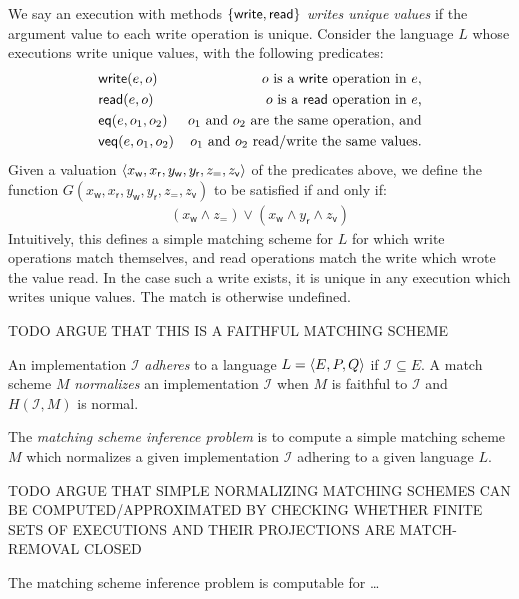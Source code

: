 \begin{example}

  We say an execution with methods ${\{{\mathsf{write}, \mathsf{read}}\}}$
  \emph{writes unique values} if the argument value to each write operation is
  unique. Consider the language $L$ whose executions write unique values, with
  the following predicates:
  \begin{align*}
    & \mathsf{write}(e,o) & \text{$o$ is a {\sf write} operation in $e$}, \\
    & \mathsf{read}(e,o) & \text{$o$ is a {\sf read} operation in $e$,} \\
    & \mathsf{eq}(e,o_1,o_2) & \text{$o_1$ and $o_2$ are the same operation, and} \\
    & \mathsf{veq}(e,o_1,o_2) & \text{$o_1$ and $o_2$ read/write the same values.}
  \end{align*}
  Given a valuation ${\left\langle{x_\mathsf{w}, x_\mathsf{r}, y_\mathsf{w},
  y_\mathsf{r}, z_\mathsf{=}, z_\mathsf{v}}\right\rangle}$ of the predicates above, we define
  the function $G(x_\mathsf{w}, x_\mathsf{r}, y_\mathsf{w}, y_\mathsf{r},
  z_\mathsf{=}, z_\mathsf{v})$ to be satisfied if and only if:
  \begin{align*}
    ( x_\mathsf{w} \land z_\mathsf{=} )
    \lor ( x_\mathsf{w} \land y_\mathsf{r} \land z_\mathsf{v} )
  \end{align*}
  Intuitively, this defines a simple matching scheme for $L$ for which write
  operations match themselves, and read operations match the write which wrote
  the value read. In the case such a write exists, it is unique in any
  execution which writes unique values. The match is otherwise undefined.

  TODO ARGUE THAT THIS IS A FAITHFUL MATCHING SCHEME 

\end{example}

An implementation $\mathcal{I}$ \emph{adheres} to a language $L = {\left\langle{E,P,Q}\right\rangle}$
if $\mathcal{I} \subseteq E$. A match scheme $M$ \emph{normalizes} an
implementation $\mathcal{I}$ when $M$ is faithful to $\mathcal{I}$ and
$H(\mathcal{I},M)$ is normal.

\begin{definition}

  The \emph{matching scheme inference problem} is to compute a simple matching
  scheme $M$ which normalizes a given implementation $\mathcal{I}$ adhering to
  a given language $L$.

\end{definition}

TODO ARGUE THAT SIMPLE NORMALIZING MATCHING SCHEMES CAN BE
COMPUTED/APPROXIMATED BY CHECKING WHETHER FINITE SETS OF EXECUTIONS AND THEIR
PROJECTIONS ARE MATCH-REMOVAL CLOSED

\begin{theorem}

  The matching scheme inference problem is computable for \ldots

\end{theorem}

